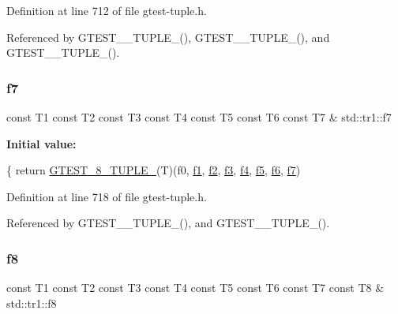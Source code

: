 Definition at line 712 of file gtest-\/tuple.\+h.



Referenced by G\+T\+E\+S\+T\+\_\+\_\+\+T\+U\+P\+L\+E\+\_\+(), G\+T\+E\+S\+T\+\_\+\_\+\+T\+U\+P\+L\+E\+\_\+(), and G\+T\+E\+S\+T\+\_\+\_\+\+T\+U\+P\+L\+E\+\_\+().

\mbox{\label{namespacestd_1_1tr1_a2185f3a1c07f2df072c39cb91ffa89a4}} 
\subsubsection{\texorpdfstring{f7}{f7}}
{\footnotesize\ttfamily const T1 const T2 const T3 const T4 const T5 const T6 const T7 \& std\+::tr1\+::f7}

{\bfseries Initial value\+:}
\begin{DoxyCode}
\{
  \textcolor{keywordflow}{return} \hyperlink{gtest-tuple_8h_a2bc36d1a71a551e6cda2ac5504fb7ce3}{GTEST\_8\_TUPLE\_}(T)(f0, \hyperlink{namespacestd_1_1tr1_a9c0fa65b105f8e2f58ba59ecf75fd000}{f1}, \hyperlink{namespacestd_1_1tr1_a87dd9e009868361317f587126dba63d4}{f2}, \hyperlink{namespacestd_1_1tr1_a0f7c3b47d27d42d82d1a333ea420ce4e}{f3}, \hyperlink{namespacestd_1_1tr1_adc796e02b7385d526aff708189564f67}{f4}, \hyperlink{namespacestd_1_1tr1_a9c1eb66b2b2fa321942af95405232a0d}{f5}, \hyperlink{namespacestd_1_1tr1_a6b62f32e1e3e21bceb94eb46c4cbfd56}{f6}, 
      \hyperlink{namespacestd_1_1tr1_a2185f3a1c07f2df072c39cb91ffa89a4}{f7})
\end{DoxyCode}


Definition at line 718 of file gtest-\/tuple.\+h.



Referenced by G\+T\+E\+S\+T\+\_\+\_\+\+T\+U\+P\+L\+E\+\_\+(), and G\+T\+E\+S\+T\+\_\+\_\+\+T\+U\+P\+L\+E\+\_\+().

\mbox{\label{namespacestd_1_1tr1_ab998afa41cea8d6d26d7e4288b0bf974}} 
\subsubsection{\texorpdfstring{f8}{f8}}
{\footnotesize\ttfamily const T1 const T2 const T3 const T4 const T5 const T6 const T7 const T8 \& std\+::tr1\+::f8}

